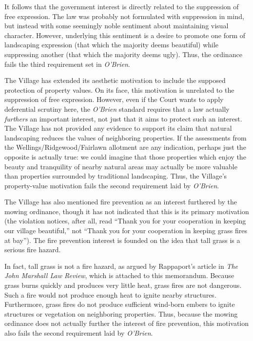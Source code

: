 \documentclass[12pt]{article}
\begin{document}
It follows that the government interest is directly related to the suppression of free expression.
The law was probably not formulated with suppression in mind, but instead with some seemingly noble sentiment about maintaining visual character.
However, underlying this sentiment is a desire to promote one form of landscaping expression (that which the majority deems beautiful) while suppressing another (that which the majority deems ugly).
Thus, the ordinance fails the third requirement set in {\em O'Brien}.

The Village has extended its aesthetic motivation to include the supposed protection of property values.
On its face, this motivation is unrelated to the suppression of free expression.
However, even if the Court wants to apply deferential scrutiny here, the {\em O'Brien} standard requires that a law actually {\em furthers} an important interest, not just that it aims to protect such an interest.
The Village has not provided any evidence to support its claim that natural landscaping reduces the values of neighboring properties.
If the assessments from the Wellings/Ridgewood/Fairlawn allotment are any indication, perhaps just the opposite is actually true:  we could imagine that those properties which enjoy the beauty and tranquility of nearby natural areas may actually be more valuable than properties surrounded by traditional landscaping.
Thus, the Village's property-value motivation fails the second requirement laid by {\em O'Brien}.

The Village has also mentioned fire prevention as an interest furthered by the mowing ordinance, though it has not indicated that this is its primary motivation (the violation notices, after all, read ``Thank you for your cooperation in keeping our village beautiful,'' not ``Thank you for your cooperation in keeping grass fires at bay'').
The fire prevention interest is founded on the idea that tall grass is a serious fire hazard.

In fact, tall grass is not a fire hazard, as argued by Rappaport's article in {\em The John Marshall Law Review}, which is attached to this memorandum.
Because grass burns quickly and produces very little heat, grass fires are not dangerous.
Such a fire would not produce enough heat to ignite nearby structures.
Furthermore, grass fires do not produce sufficient wind-born embers to ignite structures or vegetation on neighboring properties.
Thus, because the mowing ordinance does not actually further the interest of fire prevention, this motivation also fails the second requirement laid by {\em O'Brien}.
\end{document}
